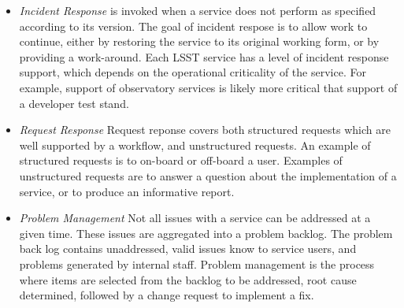 \begin{enumerate}
\begin{itemize}
  \item \emph{Incident Response} is invoked when a service does not
  perform as specified according to its version.  The goal of
  incident respose is to allow work to continue, either by
  restoring the service to its original working form, or by providing
  a work-around.  Each LSST service has a level of incident 
  response support, which depends on the operational criticality of the service.  For
  example, support of observatory services is likely more critical that support
  of a developer test stand.

  \item \emph{Request Response} Request reponse covers both structured
  requests which are well supported by a workflow, and unstructured
  requests.  An example of structured requests is to on-board or
  off-board a user. Examples of unstructured requests are to answer a
  question about the implementation of a service, or to produce an
  informative report.
 
  \item \emph{Problem Management} Not all issues with a service can be
  addressed at a given time. These issues are aggregated into a problem
  backlog. The problem back log contains unaddressed, valid issues
  know to service users, and problems generated by internal staff.
  Problem management is the process where items are selected from the
  backlog to be addressed, root cause determined, followed by a change
  request to implement a fix.
  
  \end{itemize}
  
\end{enumerate}
